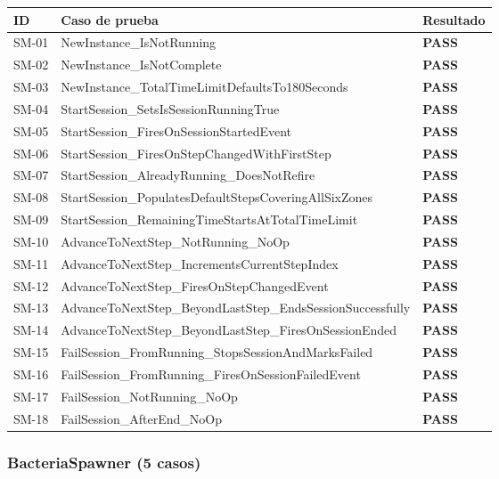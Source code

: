 \documentclass[12pt, a4paper]{article}
\newcommand{\pass}{\textcolor{heroGreen}{\textbf{PASS}}}
\begin{document}
\begin{longtable}{>{\ttfamily\small}p{1cm} p{8.5cm} >{\centering\arraybackslash}p{2cm}}
  \toprule
  \textbf{ID} & \textbf{Caso de prueba} & \textbf{Resultado} \\
  \midrule
  \endhead
  SM-01 & NewInstance\_IsNotRunning                                   & \pass \\
  SM-02 & NewInstance\_IsNotComplete                                  & \pass \\
  SM-03 & NewInstance\_TotalTimeLimitDefaultsTo180Seconds             & \pass \\
  SM-04 & StartSession\_SetsIsSessionRunningTrue                      & \pass \\
  SM-05 & StartSession\_FiresOnSessionStartedEvent                    & \pass \\
  SM-06 & StartSession\_FiresOnStepChangedWithFirstStep               & \pass \\
  SM-07 & StartSession\_AlreadyRunning\_DoesNotRefire                 & \pass \\
  SM-08 & StartSession\_PopulatesDefaultStepsCoveringAllSixZones      & \pass \\
  SM-09 & StartSession\_RemainingTimeStartsAtTotalTimeLimit           & \pass \\
  SM-10 & AdvanceToNextStep\_NotRunning\_NoOp                         & \pass \\
  SM-11 & AdvanceToNextStep\_IncrementsCurrentStepIndex               & \pass \\
  SM-12 & AdvanceToNextStep\_FiresOnStepChangedEvent                  & \pass \\
  SM-13 & AdvanceToNextStep\_BeyondLastStep\_EndsSessionSuccessfully  & \pass \\
  SM-14 & AdvanceToNextStep\_BeyondLastStep\_FiresOnSessionEnded      & \pass \\
  SM-15 & FailSession\_FromRunning\_StopsSessionAndMarksFailed        & \pass \\
  SM-16 & FailSession\_FromRunning\_FiresOnSessionFailedEvent         & \pass \\
  SM-17 & FailSession\_NotRunning\_NoOp                               & \pass \\
  SM-18 & FailSession\_AfterEnd\_NoOp                                 & \pass \\
  \bottomrule
\end{longtable}

\subsubsection{BacteriaSpawner (5 casos)}
\end{document}
